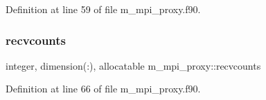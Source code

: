 Definition at line 59 of file m\+\_\+mpi\+\_\+proxy.\+f90.

\mbox{\label{namespacem__mpi__proxy_a2198e825f0884d4ee9e96b6efdb69cee}} 
\subsubsection{\texorpdfstring{recvcounts}{recvcounts}}
{\footnotesize\ttfamily integer, dimension(\+:), allocatable m\+\_\+mpi\+\_\+proxy\+::recvcounts}



Definition at line 66 of file m\+\_\+mpi\+\_\+proxy.\+f90.

